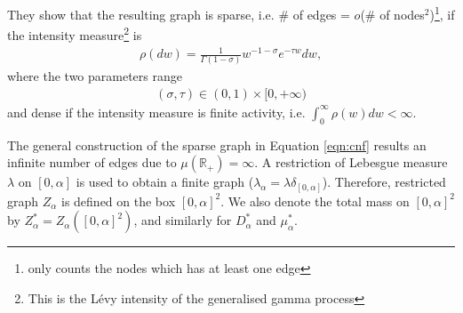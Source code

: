 \documentclass{article}
\begin{document}
They show that the resulting graph is sparse, i.e. \# of edges = $o$(\# of nodes$^2$)\footnote{only counts the nodes which has at least one edge}, if the intensity measure\footnote{This is the L\'{e}vy intensity of the generalised gamma process} is
\begin{align}
\rho(dw) = \frac{1}{\Gamma(1-\sigma)}w^{-1-\sigma}e^{-\tau w}dw,
\end{align}
where the two parameters range
\begin{align}
(\sigma, \tau) \in (0,1) \times [0, +\infty)
\end{align}
and dense if the intensity measure is finite activity, i.e. $\int_{0}^{\infty} \rho(w)dw < \infty$.

The general construction of the sparse graph in Equation \ref{eqn:cnf} results an infinite number of edges due to $\mu(\mathbb{R}_+) = \infty$. A restriction of Lebesgue measure $\lambda$ on $[0, \alpha]$ is used to obtain a finite graph ($\lambda_\alpha = \lambda\delta_{[0, \alpha]}$). Therefore, restricted graph $Z_\alpha$ is defined on the box $[0,\alpha]^2$. We also denote the total mass on $[0, \alpha]^2$ by $Z_\alpha^* = Z_\alpha([0, \alpha]^2)$, and similarly for $D_\alpha^*$ and $\mu_\alpha^*$.
\end{document}
